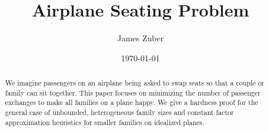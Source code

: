 \documentclass[11pt,twocolumn]{article}
\title{Airplane Seating Problem}
\author{James Zuber}
\date{\today}
\begin{document}
\maketitle

\begin{abstract}
We imagine passengers on an airplane being asked to swap seats so that a couple or family can sit together.  This paper focuses on minimizing the number of passenger exchanges to make all families on a plane happy.  We give a hardness proof for the general case of unbounded, heterogeneous family sizes and constant factor approximation heuristics for smaller families on idealized planes.
\end{abstract}




{}
\end{document}
